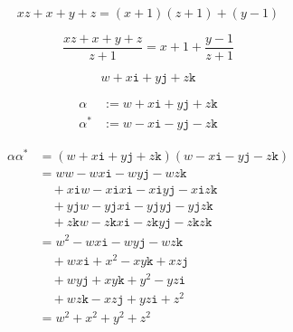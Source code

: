 \documentclass{jlreq}
\newcommand{\ii}{\mathtt{i}}
\newcommand{\jj}{\mathtt{j}}
\newcommand{\kk}{\mathtt{k}}
\begin{document}
\begin{preview}
    \begin{equation}
        xz + x + y + z = (x + 1)(z + 1) + (y - 1)
    \end{equation}
\end{preview}

\begin{preview}
    \begin{equation}
        \frac{xz + x + y + z}{z + 1} = x + 1 + \frac{y - 1}{z + 1}
    \end{equation}
\end{preview}

\begin{preview}
    \begin{equation}
        w + x \ii + y \jj + z \kk
    \end{equation}
\end{preview}

\begin{preview}
    \begin{align}
        \alpha   & := w + x \ii + y \jj + z \kk  \\
        \alpha^* & :=  w - x \ii - y \jj - z \kk
    \end{align}
\end{preview}

\begin{preview}
    \begin{align}
        \alpha \alpha^* & = (w + x \ii + y \jj + z \kk)(w - x \ii - y \jj - z \kk)  \\
                        & = ww - wx \ii - wy \jj - wz \kk                           \\
                        & \quad + x \ii w - x \ii x \ii - x \ii y \jj - x \ii z \kk \\
                        & \quad + y \jj w - y \jj x \ii - y \jj y \jj - y \jj z \kk \\
                        & \quad + z \kk w - z \kk x \ii - z \kk y \jj - z \kk z \kk \\
                        & = w^2 - wx \ii - wy \jj - wz \kk                          \\
                        & \quad + wx \ii + x^2 - xy \kk + xz \jj                    \\
                        & \quad + wy \jj + xy \kk + y^2 - yz \ii                    \\
                        & \quad + wz \kk - xz \jj + yz \ii + z^2                    \\
                        & = w^2 + x^2 + y^2 + z^2
    \end{align}
\end{preview}
\end{document}
